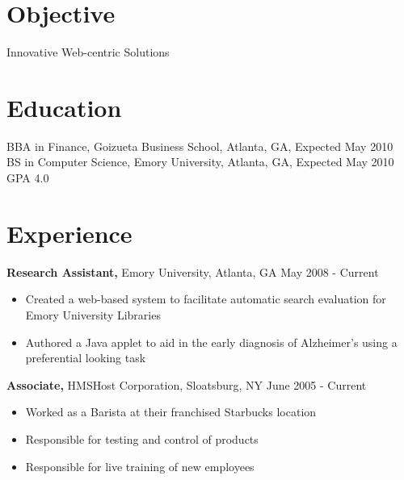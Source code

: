 \documentclass[margin]{res}
\begin{document}
 
 
\hspace{0cm}  %
 
\address{{\bf Present Address} \\ PO Box 126533 \\ Atlanta, GA 30322  \\
        (845) 222-5529 }
\address{{\bf Permanent Address} \\ 6 Park Avenue \\ Sloatsburg, NY 10974 \\
        (845) 712-5143 }

 
\begin{resume}
 
\section{Objective} 
Innovative Web-centric Solutions

\section{Education} 
BBA in Finance, Goizueta Business School, Atlanta, GA, Expected May 2010 \\
BS in Computer Science, Emory University, Atlanta, GA, Expected May 2010 \\
GPA 4.0
 

\section{Experience}
 {\bf Research Assistant,} Emory University, Atlanta, GA \hfill May 2008 - Current
 \begin{itemize} \itemsep -2pt  %
 \item Created a web-based system to facilitate automatic search evaluation
                 for Emory University Libraries
 \item Authored a Java applet to aid in the early diagnosis of Alzheimer's
                 using a preferential looking task
 \end{itemize}

 
 
{\bf Associate,} HMSHost Corporation, Sloatsburg, NY \hfill  June 2005 - Current
\begin{itemize} \itemsep -2pt %
\item Worked as a Barista at their franchised Starbucks location 
\item Responsible for testing and control of products
\item Responsible for live training of new employees 
\end{itemize}


\end{resume}
\end{document}
